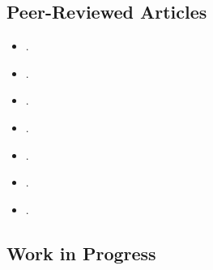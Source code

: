 \subsection*{Peer-Reviewed Articles}


\begin{itemize}

	\item[\textcolor{gray}{\textbullet}] \href{https://doi.org/10.1111/pops.12940}{}.

	\item[\textcolor{gray}{\textbullet}] \href{https://doi.org/10.1016/j.electstud.2022.102497}{}.

	\item[\textcolor{gray}{\textbullet}] \href{https://link.springer.com/article/10.1057/s41269-020-00174-4}{}.

	\item[\textcolor{gray}{\textbullet}] \href{https://doi.org/10.1016/j.ejpoleco.2021.102048}{}.

	\item[\textcolor{gray}{\textbullet}] \href{https://doi.org/10.1111/rsp3.12337}{}.

	\item[\textcolor{gray}{\textbullet}] \href{https://doi.org/10.1177/1866802X1801000202}{}.

	\item[\textcolor{gray}{\textbullet}] \href{https://scielo.conicyt.cl/pdf/revcipol/v31n2/art07.pdf}{}.
  
\end{itemize}







\subsection*{Work in Progress}


